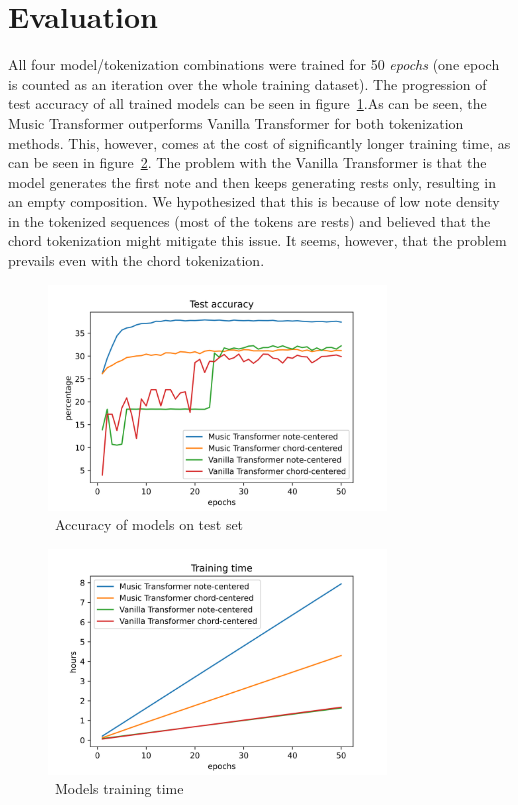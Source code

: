 \section{Evaluation}\label{sec:evaluation}

All four model/tokenization combinations were trained for 50 \textit{epochs} (one epoch is counted as an iteration over the whole training dataset).
The progression of test accuracy of all trained models can be seen in figure~\ref{fig:test-accuracy}.As can be seen, the Music Transformer outperforms Vanilla Transformer for both tokenization methods.
This, however, comes at the cost of significantly longer training time, as can be seen in figure~\ref{fig:training-time}.
The problem with the Vanilla Transformer is that the model generates the first note and then keeps generating rests only, resulting in an empty composition.
We hypothesized that this is because of low note density in the tokenized sequences (most of the tokens are rests) and believed that the chord tokenization might mitigate this issue.
It seems, however, that the problem prevails even with the chord tokenization.


\begin{figure}
    \centering
    \includegraphics[width=0.8\textwidth]{assets/test-accuracy}
    \caption{~Accuracy of models on test set}\label{fig:test-accuracy}
\end{figure}

\begin{figure}
    \centering
    \includegraphics[width=0.8\textwidth]{assets/training-time}
    \caption{~Models training time}\label{fig:training-time}
\end{figure}

